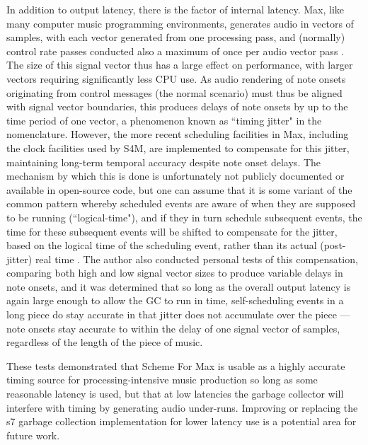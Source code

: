 \documentclass[acmsmall]{acmart}
\begin{document}
In addition to output latency, there is the factor of internal latency.
Max, like many computer music programming environments, generates audio 
in vectors of samples, with
each vector generated from one processing pass, and (normally) control
rate passes conducted also a maximum of once per audio vector pass \cite{Puckette2002}.
The size of this signal vector thus has a large effect on performance, with larger
vectors requiring significantly less CPU use. As audio rendering of note onsets originating
from control messages (the normal scenario) must thus be aligned with 
signal vector boundaries, this produces delays of note onsets by up to
the time period of one vector, a phenomenon known as ``timing jitter" in the nomenclature.
However, the more recent scheduling facilities in Max, including the 
clock facilities used by S4M, are implemented to compensate for this jitter,
maintaining long-term temporal accuracy despite note onset delays. The mechanism
by which this is done is unfortunately not publicly documented or available
in open-source code, but one can assume that it is some variant of the common pattern 
whereby scheduled events are aware of when they are supposed to be running
(``logical-time"), and if they in turn schedule subsequent events, the time for these subsequent
events will be shifted to compensate for the jitter, based 
on the logical time of the scheduling event, rather than its
actual (post-jitter) real time \cite{Anderson1986}.
The author also conducted personal tests of 
this compensation, comparing both high and low signal vector sizes to produce
variable delays in note onsets, and it was determined
that so long as the overall output latency is again large enough to allow
the GC to run in time, self-scheduling events in a long piece do stay
accurate in that jitter does not accumulate over the piece --- 
note onsets stay accurate to within the delay of one signal vector of samples,
regardless of the length of the piece of music.

These tests demonstrated that Scheme For Max is usable as a highly accurate
timing source for processing-intensive music production so long as some
reasonable latency is used, but that at low latencies the garbage
collector will interfere with timing by generating audio under-runs.
Improving or replacing the s7 garbage collection implementation for 
lower latency use is a potential area for future work. 
\end{document}
